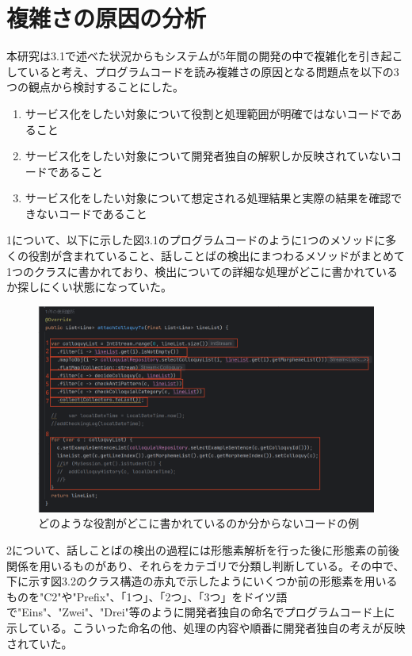 \documentclass[12pt, a4paper]{jreport}
\begin{document}
\section{複雑さの原因の分析}
本研究は3.1で述べた状況からもシステムが5年間の開発の中で複雑化を引き起こしていると考え、プログラムコードを読み複雑さの原因となる問題点を以下の3つの観点から検討することにした。
\begin{enumerate}
\item サービス化をしたい対象について役割と処理範囲が明確ではないコードであること
\item サービス化をしたい対象について開発者独自の解釈しか反映されていないコードであること
\item サービス化をしたい対象について想定される処理結果と実際の結果を確認できないコードであること
\end{enumerate}
1について、以下に示した図3.1のプログラムコードのように1つのメソッドに多くの役割が含まれていること、話しことばの検出にまつわるメソッドがまとめて1つのクラスに書かれており、検出についての詳細な処理がどこに書かれているか探しにくい状態になっていた。
\begin{figure}[H]
\centering \includegraphics[width=1\linewidth]{image/genin1.1.png}
\caption{どのような役割がどこに書かれているのか分からないコードの例}
\label{fig:enter-label}
\end{figure}
2について、話しことばの検出の過程には形態素解析を行った後に形態素の前後関係を用いるものがあり、それらをカテゴリで分類し判断している。その中で、下に示す図3.2のクラス構造の赤丸で示したようにいくつか前の形態素を用いるものを"C2"や"Prefix"、「1つ」、「2つ」、「3つ」をドイツ語で"Eins"、"Zwei"、"Drei"等のように開発者独自の命名でプログラムコード上に示している。こういった命名の他、処理の内容や順番に開発者独自の考えが反映されていた。
\end{document}
